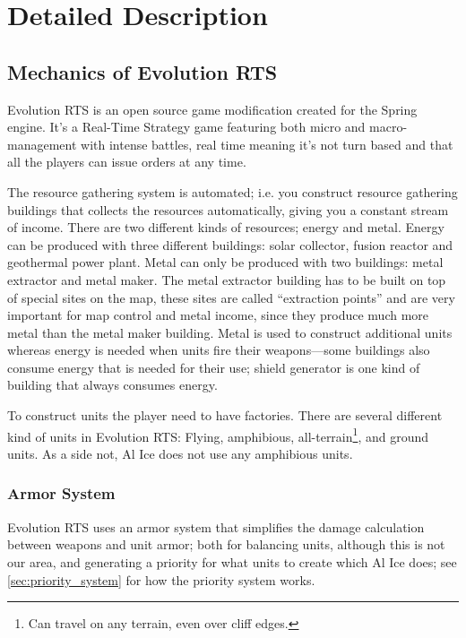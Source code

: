 \chapter[Detailed Description]{Detailed Description}
\section[Mechanics of Evolution RTS]{Mechanics of Evolution RTS}
Evolution RTS \cite{EvolutionRTS} is an open source game modification created for the Spring
engine. It's a Real-Time Strategy game featuring both micro and macro-management with
intense battles, real time meaning it's not turn based and that all the players can
issue orders at any time.

The resource gathering system is automated; i.e. you construct resource gathering
buildings that collects the resources automatically, giving you a constant stream
of income. There are two different kinds of resources; energy and metal. Energy
can be produced with three different buildings: solar collector, fusion reactor
and geothermal power plant. Metal can only be produced with two buildings: metal
extractor and metal maker. The metal extractor building has to be built on top of
special sites on the map, these sites are called ``extraction points'' and are
very important for map control and metal income, since they produce much more
metal than the metal maker building. Metal is used to construct additional units
whereas energy is needed when units fire their weapons---some buildings also
consume energy that is needed for their use; shield generator is one kind of
building that always consumes energy.


To construct units the player need to have factories. There are several different kind of units in
Evolution RTS: Flying, amphibious, all-terrain\footnote{Can travel on any terrain, even over cliff
edges.}, and ground units. As a side not, Al Ice does not use any amphibious units.

\subsection[Armor System]{Armor System}
\label{sec:armor_system}
Evolution RTS uses an armor system \cite{EvolutionRTS10} that simplifies the damage calculation
between weapons and unit armor; both for balancing units, although this is not our area, and generating a priority for what
units to create which Al Ice does; see \ref{sec:priority_system} for how the priority system works.

